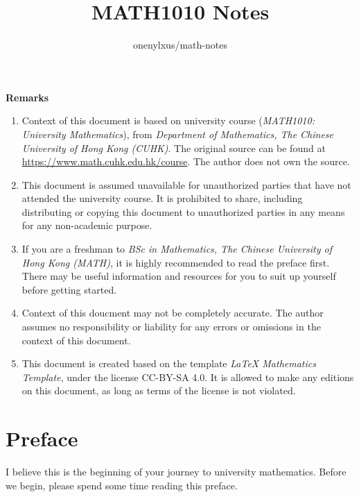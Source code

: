 \documentclass[a4paper,12pt]{article}
\newcommand{\n}{\vspace{3mm}}
\newenvironment{nlist}{ %
\begin{enumerate}[label=(\arabic*)]
}{
\end{enumerate}
}
\begin{document}
\title{MATH1010 Notes}
\author{onenylxus/math-notes}
\makeatletter
\let\getauthor\@author
\let\gettitle\@title
\makeatother
\maketitle
\thispagestyle{empty}

\n\n

\noindent \textbf{Remarks}
\begin{nlist}
  \item Context of this document is based on university course (\textit{MATH1010: University Mathematics}), from \textit{Department of Mathematics, The Chinese University of Hong Kong (CUHK)}. The original source can be found at \url{https://www.math.cuhk.edu.hk/course}. The author does not own the source.
  \item This document is assumed unavailable for unauthorized parties that have not attended the university course. It is prohibited to share, including distributing or copying this document to unauthorized parties in any means for any non-academic purpose.
  \item If you are a freshman to \textit{BSc in Mathematics, The Chinese University of Hong Kong (MATH)}, it is highly recommended to read the preface first. There may be useful information and resources for you to suit up yourself before getting started.
  \item Context of this doucment may not be completely accurate. The author assumes no responsibility or liability for any errors or omissions in the context of this document.
  \item This document is created based on the template \textit{\LaTeX{} Mathematics Template}, under the license CC-BY-SA 4.0. It is allowed to make any editions on this document, as long as terms of the license is not violated.
\end{nlist}

\pagebreak

\tableofcontents
\thispagestyle{empty}
\pagebreak

\pagestyle{fancy}
\fancyhf{}
\setlength{\headheight}{15.2pt}
\fancyhead[R]{\nouppercase \lastrightmark}
\fancyfoot[L]{\gettitle}
\fancyfoot[R]{\thepage}

\section*{Preface}
I believe this is the beginning of your journey to university mathematics. Before we begin, please spend some time reading this preface.\n
\end{document}
